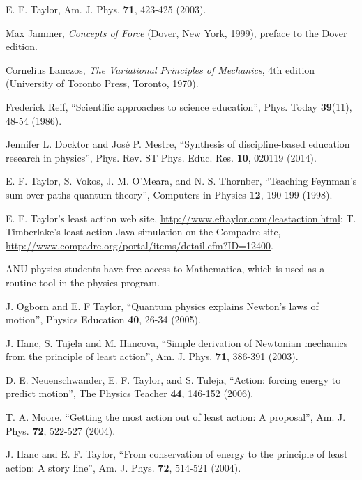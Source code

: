 \documentclass[prb,oncolumn]{revtex4-2}
\begin{document}
\begin{thebibliography}{99}

 E. F. Taylor, Am. J. Phys. \textbf{71}, 423-425 (2003).

 Max Jammer, \textit{Concepts of Force} (Dover, New York, 1999), preface to the Dover edition.

 Cornelius Lanczos, \textit{The Variational Principles of Mechanics}, 4th edition (University of Toronto Press, Toronto, 1970).

 Frederick Reif, ``Scientific approaches to science education'', Phys. Today \textbf{39}(11), 48-54 (1986).

 Jennifer L. Docktor and Jos\'e P. Mestre, ``Synthesis of discipline-based education research in physics'', Phys. Rev. ST Phys. Educ. Res. \textbf{10}, 020119 (2014).

 E. F. Taylor, S. Vokos, J. M. O'Meara, and N. S. Thornber, ``Teaching Feynman's sum-over-paths quantum theory'', Computers in Physics \textbf{12},  190-199 (1998).

  E. F. Taylor's least action web site, \url{http://www.eftaylor.com/leastaction.html}; T. Timberlake's least action Java simulation on the Compadre site, \url{http://www.compadre.org/portal/items/detail.cfm?ID=12400}.

 ANU physics students have free access to Mathematica, which is used as a routine tool in the physics program.

 J. Ogborn and E. F Taylor, ``Quantum physics explains Newton's laws of motion'', Physics Education \textbf{40}, 26-34 (2005).

 J. Hanc, S. Tujela and M. Hancova, ``Simple derivation of Newtonian mechanics from the principle of least action'', Am. J. Phys. \textbf{71}, 386-391 (2003).

 D. E. Neuenschwander, E. F. Taylor, and S. Tuleja, ``Action: forcing energy to predict motion'', The Physics Teacher \textbf{44}, 146-152 (2006).

 T. A. Moore. ``Getting the most action out of least action: A proposal'', Am. J. Phys. \textbf{72}, 522-527 (2004).

 J. Hanc and E. F. Taylor, ``From conservation of energy to the principle of least action: A story line'', Am. J. Phys. \textbf{72}, 514-521 (2004).


\end{thebibliography}
\end{document}
